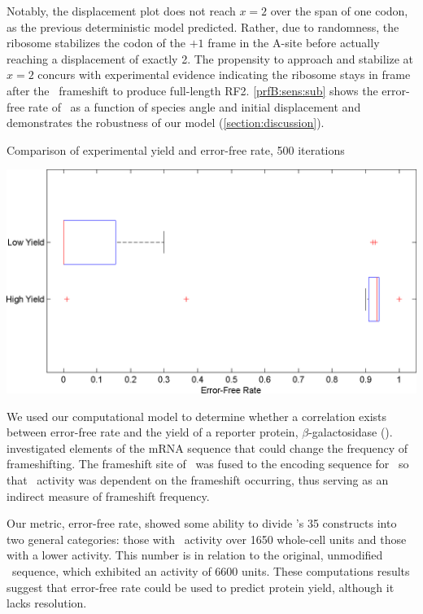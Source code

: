 \documentclass[twocolumn, article, oneside]{memoir}
\begin{document}
Notably, the displacement plot does not reach $x=2$ over the span of
one codon, as the previous deterministic model predicted.  Rather, due to randomness, the
ribosome stabilizes the codon of the $+1$ frame in the A-site before actually reaching
a displacement of exactly 2.  The propensity to approach and stabilize at $x=2$
concurs with experimental evidence indicating the ribosome
stays in frame after the \prfB\ frameshift to produce full-length RF2.
\autoref{prfB:sens:sub} shows the error-free rate of \prfB\ as a function
of species angle and initial displacement and demonstrates the
robustness of our model (\autoref{section:discussion}).

\begin{cfigure}
  \caption{Comparison of experimental yield and error-free rate, 500 iterations}
  \label{weissboxplot}
  \includegraphics[width=\linewidth]{histograms/weissbox}
\end{cfigure}

We used our computational model to determine whether a correlation exists between 
error-free rate and the yield of a reporter protein, $\beta$-galactosidase (\bgals).  
\citet{weiss87} investigated elements of the mRNA sequence that could change the frequency 
of frameshifting.  The frameshift site of \prfB\ was fused to the encoding sequence for 
\bgals\ so that \bgals\ activity was dependent on the frameshift occurring, 
thus serving as an indirect measure of frameshift frequency.  

Our metric, error-free rate, showed some ability to divide \citeauthor{weiss87}'s 35 constructs into 
two general categories: those with \bgals\ activity over 1650 whole-cell units and those with a 
lower activity.  This number is in relation to the original, unmodified \prfB\ sequence, 
which exhibited an activity of 6600 units.  These computations results suggest that 
error-free rate could be used to predict protein yield, although it lacks resolution.
\end{document}
